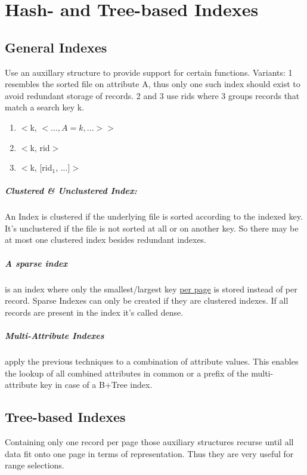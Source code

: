 \chapter{Hash- and Tree-based Indexes }

\section{General Indexes}
Use an auxillary structure to provide support for certain functions.
Variants: 1 resembles the sorted file on attribute A, thus only one such index should exist to avoid redundant storage of records. 2 and 3 use rids where 3 groups records that match a search key k.
\begin{enumerate}
    \item $<$k, $< \dots,A=k,\dots>>$
    \item $<$k, rid$>$
    \item $<$k, [rid$_1$, ...]$>$
\end{enumerate}
 \paragraph{Clustered \& Unclustered Index:} An Index is clustered if the underlying file is sorted according to the indexed key. It's unclustered if the file is not sorted at all or on another key. So there may be at most one clustered index besides redundant indexes. \\
 \paragraph{A sparse index} is an index where only the smallest/largest key \underline{per page} is stored instead of per record. Sparse Indexes can only be created if they are clustered indexes. If all records are present in the index it's called dense.
 \paragraph{Multi-Attribute Indexes} apply the previous techniques to a combination of attribute values. This enables the lookup of all combined attributes in common or a prefix of the multi-attribute key in case of a B+Tree index.
 
 
 \section{Tree-based Indexes}
 Containing only one record per page those auxiliary structures recurse until all data fit onto one page in terms of representation.  Thus they are very useful for range selections. \\
 
